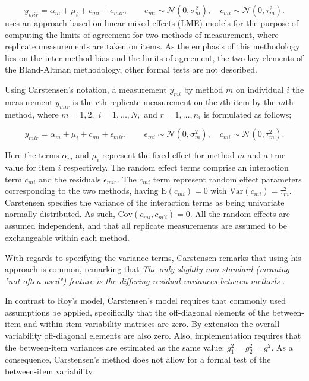 \documentclass{report}
\begin{document}
\begin{equation}
	y_{mir}  = \alpha_{m} + \mu_{i} + c_{mi} + e_{mir}, \qquad  e_{mi}
	\sim \mathcal{N}(0,\sigma^{2}_{m}), \quad c_{mi} \sim \mathcal{N}(0,\tau^{2}_{m}).
\end{equation}
\citet{BXC2008} uses an approach based on linear mixed effects (LME) models for the purpose of computing the limits of agreement for two methods of measurement, where replicate measurements are taken on items. As the emphasis of this methodology lies on the inter-method bias and the limits of agreement, the two key elements of the Bland-Altman methodology, other formal tests are not described.

Using Carstensen's notation, a measurement $y_{mi}$ by method $m$ on individual $i$ the measurement $y_{mir} $ is the $r$th replicate measurement on the $i$th item by the $m$th method, where $m=1,2,$ $i=1,\ldots,N,$ and $r = 1,\ldots,n_i$ is formulated as follows;

\begin{equation}
	y_{mir}  = \alpha_{m} + \mu_{i} + c_{mi} + \epsilon_{mir}, \qquad  e_{mi}
	\sim \mathcal{N}(0,\sigma^{2}_{m}), \quad c_{mi} \sim \mathcal{N}(0,\tau^{2}_{m}).
\end{equation}

Here the terms $\alpha_{m}$ and $\mu_{i}$ represent the fixed effect for method $m$ and a true value for item $i$ respectively. The random effect terms comprise an interaction term $c_{mi}$ and the residuals $\epsilon_{mir}$.
The $c_{mi}$ term represent random effect parameters corresponding to the two methods, having $\mathrm{E}(c_{mi})=0$ with $\mathrm{Var}(c_{mi})=\tau^2_m$. Carstensen specifies the variance of the interaction terms as being univariate normally distributed. As such, $\mathrm{Cov}(c_{mi}, c_{m^\prime i})= 0.$ All the random effects are assumed independent, and that all replicate measurements are assumed to be exchangeable within each method.

With regards to specifying the variance terms, Carstensen remarks that using his approach is common, remarking that \emph{
	The only slightly non-standard (meaning "not often used") feature is the differing residual variances between methods }\citep{bxc2010}.

In contrast to Roy's model, Carstensen's model requires that commonly used assumptions be applied, specifically that the off-diagonal elements of the between-item and within-item variability matrices are zero. By
extension the overall variability off-diagonal elements are also zero. Also, implementation requires that the between-item variances are estimated as the same value: $g^2_1 = g^2_2 = g^2$.
As a consequence, Carstensen's method does not allow for a formal test of the between-item variability.
\end{document}
